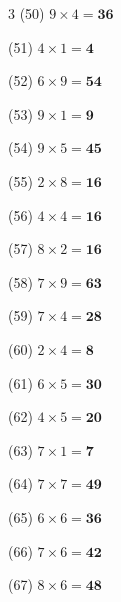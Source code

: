 \documentclass[a4paper, 11pt]{ltjsarticle}
\begin{document}
\begin{multicols*}{3}
\noindent (50) \quad $9 \times 4 = \mathbf{36}$
\vspace*{\fill}

\noindent (51) \quad $4 \times 1 = \mathbf{4}$
\vspace*{\fill}

\noindent (52) \quad $6 \times 9 = \mathbf{54}$
\vspace*{\fill}

\noindent (53) \quad $9 \times 1 = \mathbf{9}$
\vspace*{\fill}

\noindent (54) \quad $9 \times 5 = \mathbf{45}$
\vspace*{\fill}

\noindent (55) \quad $2 \times 8 = \mathbf{16}$
\vspace*{\fill}

\noindent (56) \quad $4 \times 4 = \mathbf{16}$
\vspace*{\fill}

\noindent (57) \quad $8 \times 2 = \mathbf{16}$
\vspace*{\fill}

\noindent (58) \quad $7 \times 9 = \mathbf{63}$
\vspace*{\fill}

\noindent (59) \quad $7 \times 4 = \mathbf{28}$
\vspace*{\fill}

\noindent (60) \quad $2 \times 4 = \mathbf{8}$
\vspace*{\fill}
\columnbreak

\noindent (61) \quad $6 \times 5 = \mathbf{30}$
\vspace*{\fill}

\noindent (62) \quad $4 \times 5 = \mathbf{20}$
\vspace*{\fill}

\noindent (63) \quad $7 \times 1 = \mathbf{7}$
\vspace*{\fill}

\noindent (64) \quad $7 \times 7 = \mathbf{49}$
\vspace*{\fill}

\noindent (65) \quad $6 \times 6 = \mathbf{36}$
\vspace*{\fill}

\noindent (66) \quad $7 \times 6 = \mathbf{42}$
\vspace*{\fill}

\noindent (67) \quad $8 \times 6 = \mathbf{48}$
\vspace*{\fill}


\end{multicols*}
\end{document}
